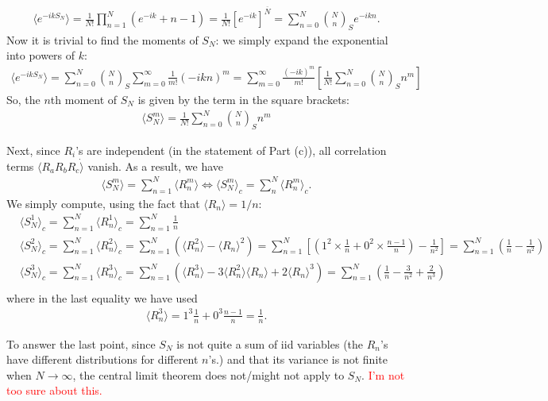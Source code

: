 \documentclass{article}
\theoremstyle{definition}
\newcommand{\f}[2]{\frac{#1}{#2}}
\newcommand{\lp}{\left(}
\newcommand{\rp}{\right)}
\newcommand{\lb}{\left[}
\newcommand{\rb}{\right]}
\begin{document}
\begin{enumerate}[label=(\alph*)]
	\begin{align*}
	\langle e^{-ik S_N} \rangle = \f{1}{N!} \prod_{n=1}^N (e^{-ik}+n-1) = \f{1}{N!} \lb e^{-ik}\rb^{\overline{N}} = \sum_{n=0}^N { N\choose{n}}_S e^{-ikn}.
	\end{align*}
	Now it is trivial to find the moments of $S_N$: we simply expand the exponential into powers of $k$:
	\begin{align*}
	\langle e^{-ik S_N} \rangle = \sum_{n=0}^N { N\choose{n}}_S \sum_{m=0}^\infty \f{1}{m!} (-ikn)^m = \sum_{m=0}^\infty \f{(-ik)^m}{m!}\lb \f{1}{N!} \sum_{n=0}^N {N\choose{n}}_S n^m  \rb
	\end{align*}
	So, the $n$th moment of $S_N$ is given by the term in the square brackets:
	\begin{align*}
	\boxed{\langle S^m_N \rangle = \f{1}{N!} \sum_{n=0}^N {N\choose{n}}_S n^m }
	\end{align*}
	
	Next, since $R_i$'s are independent (in the statement of Part (c)), all correlation terms $\langle R_a R_b R_c\dot \rangle$ vanish. As a result, we have 
	\begin{align*}
	\langle S_N^m \rangle = \sum^N_{n=1} \langle R_n^m\rangle \iff  \langle S_N^m \rangle_c = \sum^N_{n} \langle R_n^m\rangle_c. 
	\end{align*}
	We simply compute, using the fact that $\langle R_n \rangle = 1/n$:
	\begin{align*}
	&\boxed{\langle S_N^1\rangle_c} = \sum^N_{n=1} \langle R_n^1\rangle_c = \boxed{\sum^N_{n=1}\f{1}{n}}\\
	&\boxed{\langle S_N^2\rangle_c} = \sum^{N}_{n=1} \langle R_n^2 \rangle_c  = 
	\sum^N_{n=1} (\langle R_n^2 \rangle - \langle R_n\rangle^2) = \sum^N_{n=1}\lb \lp 1^2\times \f{1}{n}+ 0^2\times \f{n-1}{n} \rp - \f{1}{n^2}\rb  = \boxed{\sum^N_{n=1}\lp\f{1}{n} - \f{1}{n^2}\rp}\\
	&\boxed{\langle  S_N^3 \rangle_c} = 
	\sum^{N}_{n=1} \langle R_n^3 \rangle_c  
	= \sum^N_{n=1} (\langle R_n^3 \rangle - 3\langle R_n^2\rangle\langle R_n\rangle+2\langle R_n\rangle^3) = \boxed{\sum^N_{n=1}\lp \f{1}{n} - \f{3}{n^2} + \f{2}{n^3}\rp}\\
	\end{align*}
	where in the last equality we have used
	\begin{align*}
	\langle R_n^3\rangle = 1^3\f{1}{n} + 0^3\f{n-1}{n} = \f{1}{n}.
	\end{align*}
	
	To answer the last point, since $S_N$ is not quite a sum of iid variables (the $R_n$'s have different distributions for different $n$'s.) and that its variance is not finite when $N\to \infty$, the central limit theorem does not/might not apply to $S_N$. \textcolor{red}{I'm not too sure about this.}
	

\end{enumerate}
\end{document}
